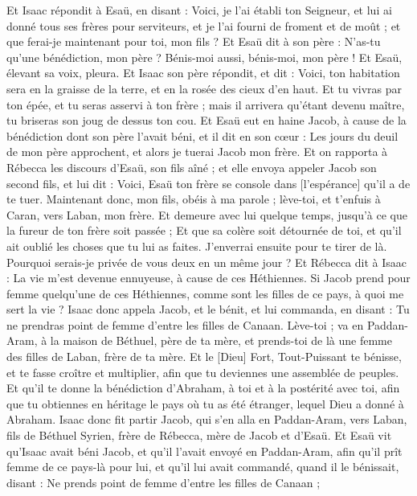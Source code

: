 \begin{multicols}{2}
Et Isaac répondit à Esaü, en disant : Voici, je l'ai établi ton Seigneur, et lui ai donné tous ses frères pour serviteurs, et je l'ai fourni de froment et de moût ; et que ferai-je maintenant pour toi, mon fils ?
Et Esaü dit à son père : N'as-tu qu'une bénédiction, mon père ? Bénis-moi aussi, bénis-moi, mon père ! Et Esaü, élevant sa voix, pleura.
Et Isaac son père répondit, et dit : Voici, ton habitation sera en la graisse de la terre, et en la rosée des cieux d'en haut.
Et tu vivras par ton épée, et tu seras asservi à ton frère ; mais il arrivera qu'étant devenu maître, tu briseras son joug de dessus ton cou.
Et Esaü eut en haine Jacob, à cause de la bénédiction dont son père l'avait béni, et il dit en son cœur : Les jours du deuil de mon père approchent, et alors je tuerai Jacob mon frère.
Et on rapporta à Rébecca les discours d'Esaü, son fils aîné ; et elle envoya appeler Jacob son second fils, et lui dit : Voici, Esaü ton frère se console dans [l'espérance] qu'il a de te tuer.
Maintenant donc, mon fils, obéis à ma parole ; lève-toi, et t'enfuis à Caran, vers Laban, mon frère.
Et demeure avec lui quelque temps, jusqu'à ce que la fureur de ton frère soit passée ;
Et que sa colère soit détournée de toi, et qu'il ait oublié les choses que tu lui as faites. J'enverrai ensuite pour te tirer de là. Pourquoi serais-je privée de vous deux en un même jour ?
Et Rébecca dit à Isaac : La vie m'est devenue ennuyeuse, à cause de ces Héthiennes. Si Jacob prend pour femme quelqu'une de ces Héthiennes, comme sont les filles de ce pays, à quoi me sert la vie ?
\VerseOne{}Isaac donc appela Jacob, et le bénit, et lui commanda, en disant : Tu ne prendras point de femme d'entre les filles de Canaan.
Lève-toi ; va en Paddan-Aram, à la maison de Béthuel, père de ta mère, et prends-toi de là une femme des filles de Laban, frère de ta mère.
Et le [Dieu] Fort, Tout-Puissant te bénisse, et te fasse croître et multiplier, afin que tu deviennes une assemblée de peuples.
Et qu'il te donne la bénédiction d'Abraham, à toi et à la postérité avec toi, afin que tu obtiennes en héritage le pays où tu as été étranger, lequel Dieu a donné à Abraham.
Isaac donc fit partir Jacob, qui s'en alla en Paddan-Aram, vers Laban, fils de Béthuel Syrien, frère de Rébecca, mère de Jacob et d'Esaü.
Et Esaü vit qu'Isaac avait béni Jacob, et qu'il l'avait envoyé en Paddan-Aram, afin qu'il prît femme de ce pays-là pour lui, et qu'il lui avait commandé, quand il le bénissait, disant : Ne prends point de femme d'entre les filles de Canaan ;

\end{multicols}
